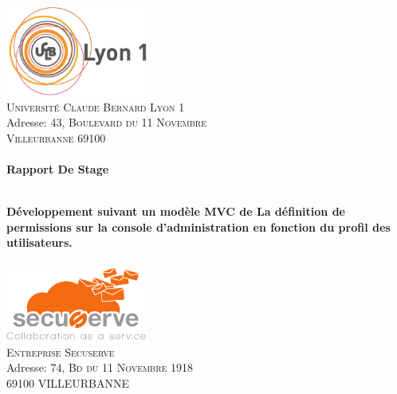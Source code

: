 \begin{titlepage}
\begin{center}

\includegraphics[width=0.35\textwidth]{./image/logo_lyon1_2.jpg}~\\[0.2cm]

\textsc{\LARGE Université Claude Bernard Lyon 1}\\
Adresse: \textsc{43, Boulevard du 11 Novembre  \\ Villeurbanne 69100}\\[1cm]

\textsc{\Large }\\[0.5cm]

{\huge \bfseries Rapport De Stage\\}

\HRule \\[0.4cm]

{\huge \bfseries \Large Développement suivant un modèle MVC de La définition de permissions sur la console d'administration en fonction du profil des utilisateurs.} \\[0.4cm]

\HRule \\[1.5cm]

\includegraphics[width=0.35\textwidth]{./image/secuserve_logo.png}~\\[0.2cm]

\textsc{\LARGE Entreprise Secuserve}\\
Adresse: \textsc{74, Bd du 11 Novembre 1918 \\ 69100 VILLEURBANNE}\\[2.5cm]


\end{center}
\end{titlepage}
